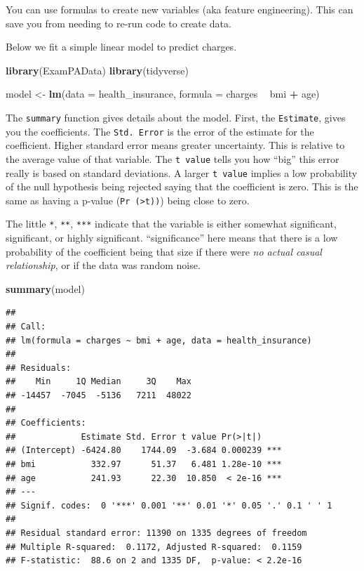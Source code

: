 \documentclass[]{book}
\newenvironment{Shaded}{\begin{snugshade}}{\end{snugshade}}
\newcommand{\DataTypeTok}[1]{\textcolor[rgb]{0.13,0.29,0.53}{#1}}
\newcommand{\KeywordTok}[1]{\textcolor[rgb]{0.13,0.29,0.53}{\textbf{#1}}}
\newcommand{\NormalTok}[1]{#1}
\newcommand{\OperatorTok}[1]{\textcolor[rgb]{0.81,0.36,0.00}{\textbf{#1}}}
\newcommand{\StringTok}[1]{\textcolor[rgb]{0.31,0.60,0.02}{#1}}
\begin{document}
You can use formulas to create new variables (aka feature engineering). This can save you from needing to re-run code to create data.

Below we fit a simple linear model to predict charges.

\begin{Shaded}
\begin{Highlighting}[]
\KeywordTok{library}\NormalTok{(ExamPAData)}
\KeywordTok{library}\NormalTok{(tidyverse)}

\NormalTok{model <-}\StringTok{ }\KeywordTok{lm}\NormalTok{(}\DataTypeTok{data =}\NormalTok{ health_insurance, }\DataTypeTok{formula =}\NormalTok{ charges }\OperatorTok{~}\StringTok{ }\NormalTok{bmi }\OperatorTok{+}\StringTok{ }\NormalTok{age)}
\end{Highlighting}
\end{Shaded}

The \texttt{summary} function gives details about the model. First, the \texttt{Estimate}, gives you the coefficients. The \texttt{Std.\ Error} is the error of the estimate for the coefficient. Higher standard error means greater uncertainty. This is relative to the average value of that variable. The \texttt{t\ value} tells you how ``big'' this error really is based on standard deviations. A larger \texttt{t\ value} implies a low probability of the null hypothesis being rejected saying that the coefficient is zero. This is the same as having a p-value (\texttt{Pr\ (\textgreater{}\textbar{}t\textbar{}))}) being close to zero.

The little \texttt{*}, \texttt{**}, \texttt{***} indicate that the variable is either somewhat significant, significant, or highly significant. ``significance'' here means that there is a low probability of the coefficient being that size if there were \emph{no actual casual relationship}, or if the data was random noise.

\begin{Shaded}
\begin{Highlighting}[]
\KeywordTok{summary}\NormalTok{(model)}
\end{Highlighting}
\end{Shaded}

\begin{verbatim}
## 
## Call:
## lm(formula = charges ~ bmi + age, data = health_insurance)
## 
## Residuals:
##    Min     1Q Median     3Q    Max 
## -14457  -7045  -5136   7211  48022 
## 
## Coefficients:
##             Estimate Std. Error t value Pr(>|t|)    
## (Intercept) -6424.80    1744.09  -3.684 0.000239 ***
## bmi           332.97      51.37   6.481 1.28e-10 ***
## age           241.93      22.30  10.850  < 2e-16 ***
## ---
## Signif. codes:  0 '***' 0.001 '**' 0.01 '*' 0.05 '.' 0.1 ' ' 1
## 
## Residual standard error: 11390 on 1335 degrees of freedom
## Multiple R-squared:  0.1172, Adjusted R-squared:  0.1159 
## F-statistic:  88.6 on 2 and 1335 DF,  p-value: < 2.2e-16
\end{verbatim}
\end{document}
